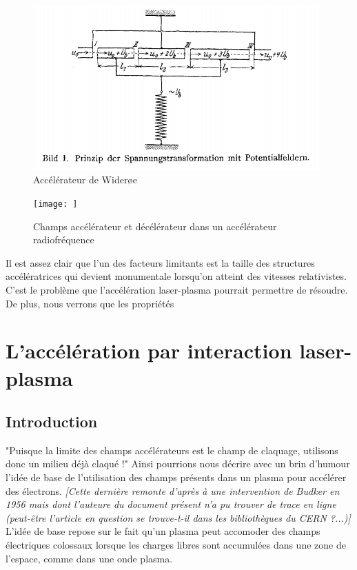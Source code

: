 \documentclass[a4paper]{book}
\begin{document}
\begin{figure}[!htbp]
\begin{center}
\includegraphics[width=11cm]{Wideroe.PNG}
\end{center}
\caption{Accélérateur de Wider{\o}e~\cite{Wideroe1928}}
\label{fig:wideroe}
\end{figure}

\begin{figure}[!htbp]
\begin{center}
\texttt{[image: ]}
\end{center}
\caption{Champs accélérateur et décélérateur dans un accélérateur radiofréquence}
\label{fig:acc_dec}
\end{figure}

Il est assez clair que l'un des facteurs limitants est la taille des structures accélératrices qui devient monumentale lorsqu'on atteint des vitesses relativistes. C'est le problème que l'accélération laser-plasma pourrait permettre de résoudre. De plus, nous verrons que les propriétés 


\section{L'accélération par interaction laser-plasma}

\subsection{Introduction}

"Puisque la limite des champs accélérateurs est le champ de claquage, utilisons donc un milieu déjà claqué !" Ainsi pourrions nous décrire avec un brin d'humour l'idée de base de l'utilisation des champs présents dans un plasma pour accélérer des électrons. \textit{[Cette dernière remonte d'après \cite{malka} à une intervention de Budker en 1956 \cite{budker} mais dont l'auteure du document présent n'a pu trouver de trace en ligne (peut-être l'article en question se trouve-t-il dans les bibliothèques du CERN ?...)]}  
L'idée de base repose sur le fait qu'un plasma peut accomoder des champs électriques colossaux lorsque les charges libres sont accumulées dans une zone de l'espace, comme dans une onde plasma. 
\end{document}
